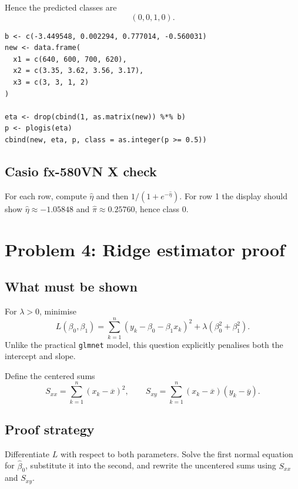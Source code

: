 ﻿\documentclass[11pt]{article}
\begin{document}
Hence the predicted classes are
\[
  \boxed{(0,0,1,0).}
\]

\begin{lstlisting}
b <- c(-3.449548, 0.002294, 0.777014, -0.560031)
new <- data.frame(
  x1 = c(640, 600, 700, 620),
  x2 = c(3.35, 3.62, 3.56, 3.17),
  x3 = c(3, 3, 1, 2)
)

eta <- drop(cbind(1, as.matrix(new)) %*% b)
p <- plogis(eta)
cbind(new, eta, p, class = as.integer(p >= 0.5))
\end{lstlisting}

\subsection*{Casio fx-580VN X check}

For each row, compute $\widehat\eta$ and then
$1/(1+e^{-\widehat\eta})$. For row 1 the display should show
$\widehat\eta\approx-1.05848$ and $\widehat\pi\approx0.25760$, hence class 0.

\section{Problem 4: Ridge estimator proof}

\subsection*{What must be shown}

For $\lambda>0$, minimise
\[
L(\beta_0,\beta_1)
=\sum_{k=1}^n(y_k-\beta_0-\beta_1x_k)^2
+\lambda(\beta_0^2+\beta_1^2).
\]
Unlike the practical \texttt{glmnet} model, this question explicitly penalises
both the intercept and slope.

Define the centered sums
\[
S_{xx}=\sum_{k=1}^n(x_k-\overline x)^2,
\qquad
S_{xy}=\sum_{k=1}^n(x_k-\overline x)(y_k-\overline y).
\]

\subsection*{Proof strategy}

Differentiate $L$ with respect to both parameters. Solve the first normal
equation for $\widehat\beta_0$, substitute it into the second, and rewrite the
uncentered sums using $S_{xx}$ and $S_{xy}$.
\end{document}
